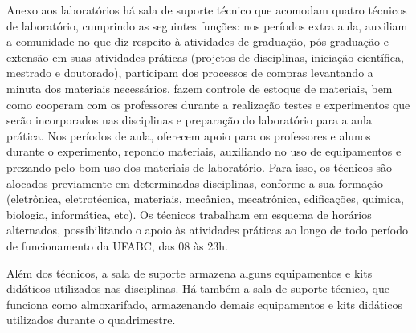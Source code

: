 Anexo aos laboratórios há sala de suporte técnico que acomodam quatro técnicos
de laboratório, cumprindo as seguintes funções: nos períodos extra aula,
auxiliam a comunidade no que diz respeito à atividades de graduação,
pós-graduação e extensão em suas atividades práticas (projetos de disciplinas,
iniciação científica, mestrado e doutorado), participam dos processos de
compras levantando a minuta dos materiais necessários, fazem controle de
estoque de materiais, bem como cooperam com os professores durante a realização
testes e experimentos que serão incorporados nas disciplinas e preparação do
laboratório para a aula prática.
Nos períodos de aula, oferecem apoio para os professores e alunos durante o
experimento, repondo materiais, auxiliando no uso de equipamentos e prezando
pelo bom uso dos materiais de laboratório. Para isso, os técnicos são alocados
previamente em determinadas disciplinas, conforme a sua formação (eletrônica,
eletrotécnica, materiais, mecânica, mecatrônica, edificações, química,
biologia, informática, etc).
Os técnicos trabalham em esquema de horários alternados, possibilitando o apoio
às atividades práticas ao longo de todo período de funcionamento da UFABC, das
08 às 23h.

Além dos técnicos, a sala de suporte armazena alguns equipamentos e kits
didáticos utilizados nas disciplinas. 
Há também a sala de suporte técnico, que funciona como almoxarifado,
armazenando demais equipamentos e kits didáticos utilizados durante o
quadrimestre.

